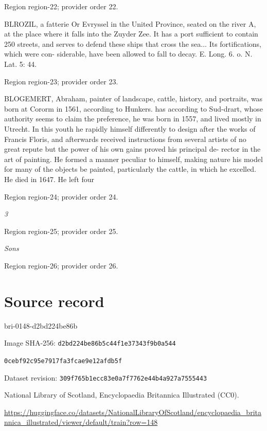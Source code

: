 \documentclass[11pt]{article}
\begin{document}
{\scriptsize\color{gray} Region region-22; provider order 22.\par}
\medskip

BLROZIL, a fatterie Or Evryssel in the United Province, seated on the river A, at the place where it falls into the Zuyder Zee. It has a port sufficient to contain 250 streets, and serves to defend these ships that cross the sea... Its fortifications, which were con- siderable, have been allowed to fall to decay. E. Long. 6. o. N. Lat. 5: 44.
\par

{\scriptsize\color{gray} Region region-23; provider order 23.\par}
\medskip

BLOGEMERT, Abraham, painter of landscape, cattle, history, and portraits, was born at Cororm in 1561, according to Hunkers. has according to Sud-drart, whose authority seems to claim the preference, he was born in 1557, and lived mostly in Utrecht. In this youth he rapidly himself differently to design after the works of Francis Floris, and afterwards received instructions from several artists of no great repute but the power of his own gains proved his principal de- rector in the art of painting. He formed a manner peculiar to himself, making nature his model for many of the objects be painted, particularly the cattle, in which he excelled. He died in 1647. He left four
\par

{\scriptsize\color{gray} Region region-24; provider order 24.\par}
\medskip

{\small\itshape 3\par}

{\scriptsize\color{gray} Region region-25; provider order 25.\par}
\medskip

{\small\itshape Sons\par}

{\scriptsize\color{gray} Region region-26; provider order 26.\par}
\medskip
\newpage\section*{Source record}
bri-0148-d2bd224be86b\par
Image SHA-256: \texttt{d2bd224be86b5c44f1e37343f9b0a544}\par\texttt{0cebf92c95e7917fa3fcae9e12afdb5f}\par
Dataset revision: \texttt{309f765b1ecc83e0a7f7}\texttt{762e44b4a927a7555443}\par
National Library of Scotland, Encyclopaedia Britannica Illustrated (CC0).\par
\url{https://huggingface.co/datasets/NationalLibraryOfScotland/encyclopaedia_britannica_illustrated/viewer/default/train?row=148}
\end{document}
